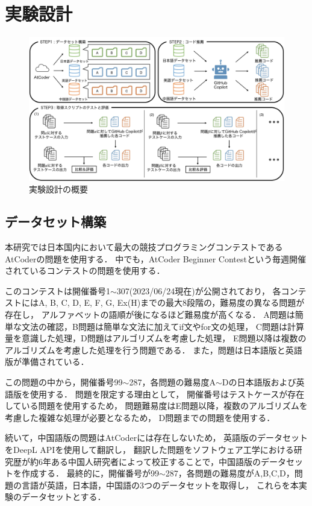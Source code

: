 \section{実験設計\label{approach}}
  \begin{figure}[t]
    \centering
    \includegraphics[scale=0.35]{image/system.jpg}
    \caption{実験設計の概要}
    \label{experiment_design}
  \end{figure}
  
  \subsection{データセット構築\label{build_dataset}}
    本研究では日本国内において最大の競技プログラミングコンテストであるAtCoder\cite{AtCoder}の問題を使用する．
    中でも，AtCoder Beginner Contestという毎週開催されているコンテストの問題を使用する．
    
    このコンテストは開催番号1${\sim}$307(2023/06/24現在)が公開されており，
    各コンテストにはA, B, C, D, E, F, G, Ex(H)までの最大8段階の，難易度の異なる問題が存在し，
    アルファベットの語順が後になるほど難易度が高くなる．
    A問題は簡単な文法の確認，B問題は簡単な文法に加えてif文やfor文の処理，
    C問題は計算量を意識した処理，D問題はアルゴリズムを考慮した処理，
    E問題以降は複数のアルゴリズムを考慮した処理を行う問題である．
    また，問題は日本語版と英語版が準備されている．
    
    この問題の中から，開催番号99${\sim}$287，各問題の難易度A${\sim}$Dの日本語版および英語版を使用する．
    問題を限定する理由として，
    開催番号はテストケースが存在している問題を使用するため，
    問題難易度はE問題以降，複数のアルゴリズムを考慮した複雑な処理が必要となるため，
    D問題までの問題を使用する．
    
    続いて，中国語版の問題はAtCoderには存在しないため，
    英語版のデータセットをDeepL APIを使用して翻訳し，
    翻訳した問題をソフトウェア工学における研究歴が約6年ある中国人研究者によって校正することで，中国語版のデータセットを作成する．
    最終的に，開催番号が99${\sim}$287，各問題の難易度がA,B,C,D，問題の言語が英語，日本語，中国語の3つのデータセットを取得し，
    これらを本実験のデータセットとする．

